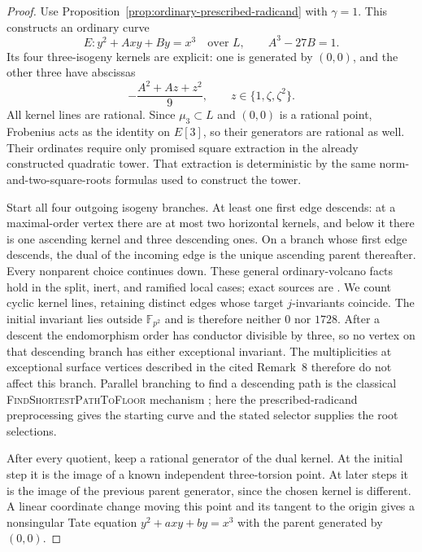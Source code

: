 \documentclass[11pt]{article}
\theoremstyle{definition}
\theoremstyle{remark}
\begin{document}
\begin{proof}
Use Proposition~\ref{prop:ordinary-prescribed-radicand} with
$\gamma=1$.  This constructs an ordinary curve
\[
 E:y^2+Axy+By=x^3\quad\text{over }L,
 \qquad A^3-27B=1.
\]
Its four three-isogeny kernels are explicit: one is generated
by $(0,0)$, and the other three have abscissas
\[
 -\frac{A^2+Az+z^2}{9},\qquad z\in\{1,\zeta,\zeta^2\}.
\]
All kernel lines are rational.  Since $\mu_3\subset L$ and
$(0,0)$ is a rational point, Frobenius acts as the identity on
$E[3]$, so their generators are rational as well.  Their
ordinates require only promised square extraction in the
already constructed quadratic tower.  That extraction is
deterministic by the same norm-and-two-square-roots formulas
used to construct the tower.

Start all four outgoing isogeny branches.  At least one first
edge descends: at a maximal-order vertex there are at most
two horizontal kernels, and below it there is one ascending
kernel and three descending ones.  On a branch whose first
edge descends, the dual of the incoming edge is the unique ascending
parent thereafter.  Every nonparent choice continues down.
These general ordinary-volcano facts hold in the split,
inert, and ramified local cases; exact sources are
\cite[Section~2.9, p.~514; Lemma~6, p.~515; Theorem~7 and
Remark~8, pp.~516--517]{Sutherland2013Volcanoes}.
We count cyclic kernel lines, retaining distinct edges whose
target $j$-invariants coincide.  The initial invariant lies
outside $\mathbb F_{p^2}$ and is therefore neither $0$ nor
$1728$.  After a descent the endomorphism order has conductor
divisible by three, so no vertex on that descending branch
has either exceptional invariant.  The multiplicities at
exceptional surface vertices described in the cited Remark~8
therefore do not affect this branch.
Parallel branching to find a descending path is the classical
\textsc{FindShortestPathToFloor} mechanism
\cite[Section~3.1, pp.~519--520]{Sutherland2013Volcanoes};
here the prescribed-radicand preprocessing gives the starting curve and
the stated selector supplies the root selections.

After every quotient, keep a rational generator of the dual
kernel.  At the initial step it is the image of a known
independent three-torsion point.  At later steps it is the
image of the previous parent generator, since the chosen
kernel is different.  A linear coordinate change moving this
point and its tangent to the origin gives a nonsingular Tate
equation $y^2+axy+by=x^3$ with the parent generated by $(0,0)$.


\end{proof}
\end{document}
